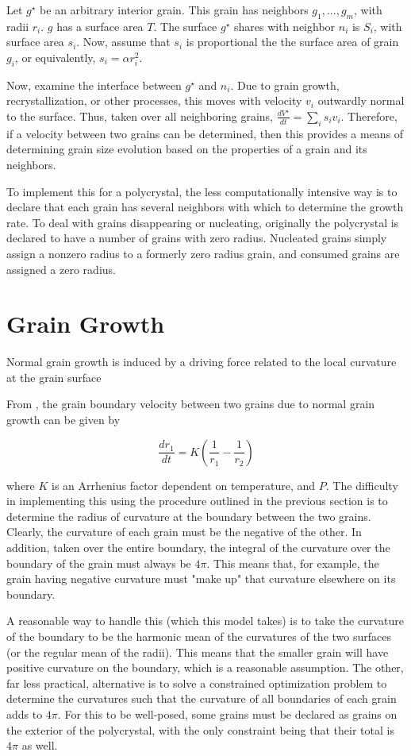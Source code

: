 \documentclass{article}
\begin{document}
Let $g^{\star}$ be an arbitrary interior grain. This grain has neighbors $g_1,...,g_m$, with radii $r_i$. $g$ has a surface area $T$. The surface $g^{\star}$ shares with neighbor $n_i$ is $S_i$, with surface area $s_i$. Now, assume that $s_i$ is proportional the the surface area of grain $g_i$, or equivalently, $s_i=\alpha r_i^2$.

Now, examine the interface between $g^{\star}$ and $n_i$. Due to grain growth, recrystallization, or other processes, this moves with velocity $v_i$ outwardly normal to the surface. Thus, taken over all neighboring grains, $\frac{dV^{\star}}{dt}=\sum_{i}s_i v_i$. Therefore, if a velocity between two grains can be determined, then this provides a means of determining grain size evolution based on the properties of a grain and its neighbors.

To implement this for a polycrystal, the less computationally intensive way is to declare that each grain has several neighbors with which to determine the growth rate. To deal with grains disappearing or nucleating, originally the polycrystal is declared to have a number of grains with zero radius. Nucleated grains simply assign a nonzero radius to a formerly zero radius grain, and consumed grains are assigned a zero radius. 

\section{Grain Growth}
Normal grain growth is induced by a driving force related to the local curvature at the grain surface

From \citet{durand2006}, the grain boundary velocity between two grains due to normal grain growth can be given by

\[\frac{dr_1}{dt} = K \left( \frac{1}{r_1}-\frac{1}{r_2} \right)
\]

where $K$ is an Arrhenius factor dependent on temperature, and $P$. The difficulty in implementing this using the procedure outlined in the previous section is to determine the radius of curvature at the boundary between the two grains. Clearly, the curvature of each grain must be the negative of the other. In addition, taken over the entire boundary, the integral of the curvature over the boundary of the grain must always be $4 \pi$. This means that, for example, the grain having negative curvature must "make up" that curvature elsewhere on its boundary. 

A reasonable way to handle this (which this model takes)  is to take the curvature of the boundary to be the harmonic mean of the curvatures of the two surfaces (or the regular mean of the radii). This means that the smaller grain will have positive curvature on the boundary, which is a reasonable assumption. The other, far less practical, alternative is to solve a constrained optimization problem to determine the curvatures such that the curvature of all boundaries of each grain adds to $4 \pi$. For this to be well-posed, some grains must be declared as grains on the exterior of the polycrystal, with the only constraint being that their total is $4 \pi$ as well. 
\end{document}
